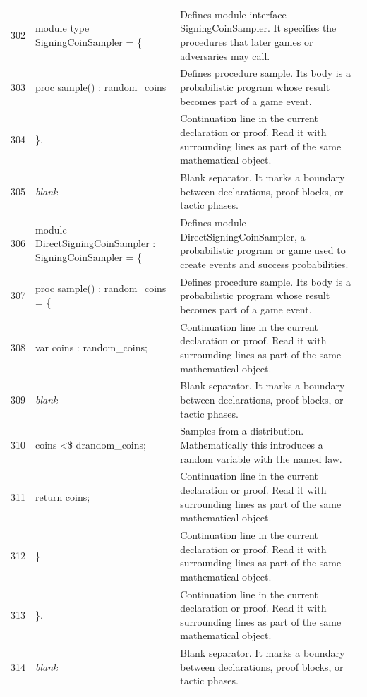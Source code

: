 \documentclass[10pt]{article}
\begin{document}
\begin{longtable}{r L{0.53\textwidth} L{0.37\textwidth}}
302 & {\ttfamily\scriptsize module type SigningCoinSampler = \{} & Defines module interface SigningCoinSampler.  It specifies the procedures that later games or adversaries may call. \\
303 & {\ttfamily\scriptsize   proc sample() : random\_coins} & Defines procedure sample.  Its body is a probabilistic program whose result becomes part of a game event. \\
304 & {\ttfamily\scriptsize \}.} & Continuation line in the current declaration or proof.  Read it with surrounding lines as part of the same mathematical object. \\
305 & {\ttfamily\scriptsize \emph{blank}} & Blank separator.  It marks a boundary between declarations, proof blocks, or tactic phases. \\
306 & {\ttfamily\scriptsize module DirectSigningCoinSampler : SigningCoinSampler = \{} & Defines module DirectSigningCoinSampler, a probabilistic program or game used to create events and success probabilities. \\
307 & {\ttfamily\scriptsize   proc sample() : random\_coins = \{} & Defines procedure sample.  Its body is a probabilistic program whose result becomes part of a game event. \\
308 & {\ttfamily\scriptsize     var coins : random\_coins;} & Continuation line in the current declaration or proof.  Read it with surrounding lines as part of the same mathematical object. \\
309 & {\ttfamily\scriptsize \emph{blank}} & Blank separator.  It marks a boundary between declarations, proof blocks, or tactic phases. \\
310 & {\ttfamily\scriptsize     coins <\$ drandom\_coins;} & Samples from a distribution.  Mathematically this introduces a random variable with the named law. \\
311 & {\ttfamily\scriptsize     return coins;} & Continuation line in the current declaration or proof.  Read it with surrounding lines as part of the same mathematical object. \\
312 & {\ttfamily\scriptsize   \}} & Continuation line in the current declaration or proof.  Read it with surrounding lines as part of the same mathematical object. \\
313 & {\ttfamily\scriptsize \}.} & Continuation line in the current declaration or proof.  Read it with surrounding lines as part of the same mathematical object. \\
314 & {\ttfamily\scriptsize \emph{blank}} & Blank separator.  It marks a boundary between declarations, proof blocks, or tactic phases. \\

\end{longtable}
\end{document}
